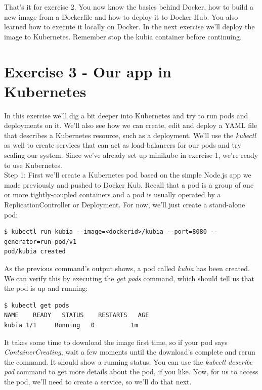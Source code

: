 \documentclass[a4paper,10pt]{article}
\begin{document}
That's it for exercise 2. You now know the basics behind Docker, how to build a new image from a Dockerfile and how to deploy it to Docker Hub. You also learned how to execute it locally on Docker. In the next exercise we'll deploy the image to Kubernetes. Remember stop the kubia container before continuing.

\pagebreak

\section{Exercise 3 - Our app in Kubernetes}

In this exercise we'll dig a bit deeper into Kubernetes and try to run pods and deployments on it. We'll also see how we can create, edit and deploy a YAML file that describes a Kubernetes resource, such as a deployment. We'll use the \textit{kubectl} as well to create services that can act as load-balancers for our pods and try scaling our system. Since we've already set up minikube in exercise 1, we're ready to use Kubernetes. \\

Step 1: First we'll create a Kubernetes pod based on the simple Node.js app we made previously and pushed to Docker Kub. Recall that a pod is a group of one or more tightly-coupled containers and a pod is usually operated by a ReplicationController or Deployment. For now, we'll just create a stand-alone pod:

\begin{lstlisting}[numbers=none, basicstyle=\ttfamily]
$ kubectl run kubia --image=<dockerid>/kubia --port=8080 --generator=run-pod/v1
pod/kubia created
\end{lstlisting}

As the previous command's output shows, a pod called \textit{kubia} has been created. We can verify this by executing the \textit{get pods} command, which should tell us that the pod is up and running:

\begin{lstlisting}[numbers=none, basicstyle=\ttfamily]
$ kubectl get pods
NAME	READY   STATUS    RESTARTS   AGE
kubia 1/1     Running   0          1m
\end{lstlisting}

It takes some time to download the image first time, so if your pod says \textit{ContainerCreating}, wait a few moments until the download's complete and rerun the command. It should show a running status. You can use the \textit{kubectl describe pod} command to get more details about the pod, if you like. Now, for us to access the pod, we'll need to create a service, so we'll do that next. \\
\end{document}
